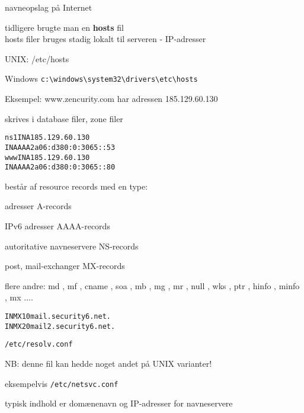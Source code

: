 \documentclass[Screen16to9,17pt]{foils}
\begin{document}

\begin{list1}
\item navneopslag på Internet
\item tidligere brugte man en {\bfseries hosts} fil\\
hosts filer bruges stadig lokalt til serveren - IP-adresser
\item UNIX: /etc/hosts
\item Windows \verb+c:\windows\system32\drivers\etc\hosts+
\item Eksempel: www.zencurity.com har adressen 185.129.60.130
\item skrives i database filer, zone filer
\end{list1}

\begin{alltt}
ns1     IN      A       185.129.60.130
        IN      AAAA    2a06:d380:0:3065::53
www     IN      A       185.129.60.130
        IN      AAAA    2a06:d380:0:3065::80
\end{alltt}


\begin{list1}
  \item består af resource records med en type:
    \begin{list2}
\item adresser A-records
\item IPv6 adresser AAAA-records
\item autoritative navneservere NS-records
\item post, mail-exchanger MX-records
\item flere andre: md ,  mf ,  cname ,  soa ,
                  mb , mg ,  mr ,  null ,  wks ,  ptr ,
                  hinfo ,  minfo ,  mx ....
\end{list2}
\end{list1}
\begin{alltt}
        IN      MX      10      mail.security6.net.
        IN      MX      20      mail2.security6.net.
\end{alltt}


\begin{list1}
\item \verb+/etc/resolv.conf+
\item NB: denne fil kan hedde noget andet på UNIX varianter!
\item eksempelvis \verb+/etc/netsvc.conf+
\item typisk indhold er domænenavn og IP-adresser for navneservere
\end{list1}
\end{document}
